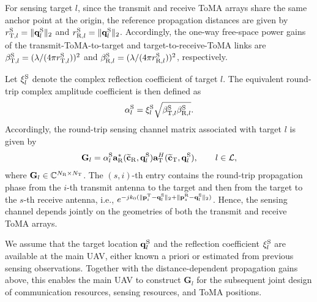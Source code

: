 \documentclass[letterpaper,journal]{IEEEtran}
\begin{document}
For sensing target $l$, since the transmit and receive ToMA arrays
share the same anchor point at the origin, the reference propagation
distances are given by
$r_{{\rm T},l}^{\rm S}=\|\mathbf q_l^{\rm S}\|_2$ and
$r_{{\rm R},l}^{\rm S}=\|\mathbf q_l^{\rm S}\|_2$.
Accordingly, the one-way free-space power gains of the
transmit-ToMA-to-target and target-to-receive-ToMA links are
$\beta_{{\rm T},l}^{\rm S}
=(\lambda/(4\pi r_{{\rm T},l}^{\rm S}))^2$
and
$\beta_{{\rm R},l}^{\rm S}
=(\lambda/(4\pi r_{{\rm R},l}^{\rm S}))^2$,
respectively.

Let $\xi_l^{\rm S}$ denote the complex reflection coefficient of
target $l$. The equivalent round-trip complex amplitude coefficient
is then defined as
\begin{equation}
\alpha_l^{\rm S}
=
\xi_l^{\rm S}
\sqrt{
\beta_{{\rm T},l}^{\rm S}
\beta_{{\rm R},l}^{\rm S}
}.
\label{eq:round_trip_coeff}
\end{equation}
Accordingly, the round-trip sensing channel matrix associated with
target $l$ is given by
\begin{equation}
\mathbf G_l
=
\alpha_l^{\rm S}
\mathbf a_{\rm R}^{*}
(\widetilde{\mathbf c}_{\rm R},\mathbf q_l^{\rm S})
\mathbf a_{\rm T}^{H}
(\widetilde{\mathbf c}_{\rm T},\mathbf q_l^{\rm S}),
\qquad
l\in\mathcal L,
\label{eq:sensing_channel}
\end{equation}
where $\mathbf G_l\in\mathbb C^{N_{\rm R}\times N_{\rm T}}$.
The $(s,i)$-th entry contains the round-trip propagation phase from
the $i$-th transmit antenna to the target and then from the target to
the $s$-th receive antenna, i.e.,
$e^{-j k_0(\|\mathbf p_i^{\rm T}-\mathbf q_l^{\rm S}\|_2+
\|\mathbf p_s^{\rm R}-\mathbf q_l^{\rm S}\|_2)}$.
Hence, the sensing channel depends jointly on the geometries of both
the transmit and receive ToMA arrays.

We assume that the target location $\mathbf q_l^{\rm S}$ and the
reflection coefficient $\xi_l^{\rm S}$ are available at the main UAV,
either known a priori or estimated from previous sensing observations.
Together with the distance-dependent propagation gains above, this
enables the main UAV to construct $\mathbf G_l$ for the subsequent
joint design of communication resources, sensing resources, and ToMA
positions.
\end{document}

